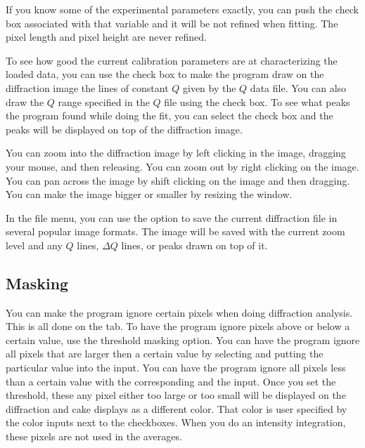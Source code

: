 If you know some of the experimental parameters exactly, you
can push the  check box associated with that
variable and it will be not refined when fitting. The pixel 
length and pixel height are never refined.

To see how good the current calibration parameters are at
characterizing the loaded data, you can use the 
 check box to make the program draw
on the diffraction image the lines of constant $Q$ given
by the $Q$ data file. You can also draw the $Q$ range 
specified in the $Q$ file using the  
check box. To see what peaks the program found while doing the 
fit, you can select the  check box and the
peaks will be displayed on top of the diffraction image.

You can zoom into the diffraction image by left clicking
in the image, dragging your mouse, and then releasing.
You can zoom out by right clicking on the image. You can
pan across the image by shift clicking on the image and 
then dragging. You can make the image bigger or smaller 
by resizing the window.

In the file menu, you can use the  option
to save the current diffraction file in several popular
image formats. The image will be saved with the current
zoom level and any $Q$ lines, $\Delta Q$ lines, or peaks
drawn on top of it.

\subsection{Masking}

You can make the program ignore certain pixels when doing
diffraction analysis. This is all done on the 
tab. To have the program ignore pixels above or below a 
certain value, use the threshold masking option.
You can have the program ignore all pixels that are larger 
then a certain value by selecting 
 and putting the particular value
into the  input.
You can have the program ignore all pixels less than a certain
value with the corresponding 
and the  input.
Once you set the threshold, these any pixel either too large
or too small will be displayed on the diffraction and cake
displays as a different color. That color is user 
specified by the color inputs next to the checkboxes. 
When you do an intensity integration, these pixels are 
not used in the averages.


